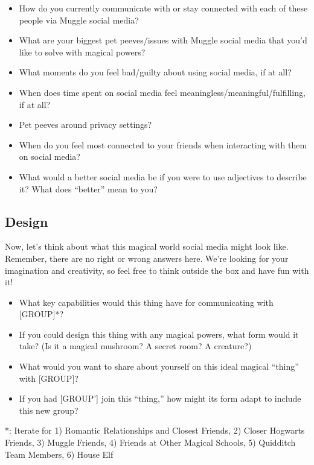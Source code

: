 \begin{itemize}
    \item How do you currently communicate with or stay connected with each of these people via Muggle social media?
    \item What are your biggest pet peeves/issues with Muggle social media that you'd like to solve with magical powers?
    \item What moments do you feel bad/guilty about using social media, if at all?
    \item When does time spent on social media feel meaningless/meaningful/fulfilling, if at all?
    \item Pet peeves around privacy settings?
    \item When do you feel most connected to your friends when interacting with them on social media?
    \item What would a better social media be if you were to use adjectives to describe it? What does “better” mean to you?
\end{itemize}

\subsection*{Design}
Now, let's think about what this magical world social media might look like. Remember, there are no right or wrong answers here. We're looking for your imagination and creativity, so feel free to think outside the box and have fun with it!

\begin{itemize}
    \item What key capabilities would this thing have for communicating with [GROUP]*?
    \item If you could design this thing with any magical powers, what form would it take? (Is it a magical mushroom? A secret room? A creature?)
    \item What would you want to share about yourself on this ideal magical ``thing'' with [GROUP]?
    \item If you had [GROUP'] join this ``thing,'' how might its form adapt to include this new group?
\end{itemize}

*: Iterate for 1) Romantic Relationships and Closest Friends, 2) Closer Hogwarts Friends, 3) Muggle Friends, 4) Friends at Other Magical Schools, 5) Quidditch Team Members, 6) House Elf


